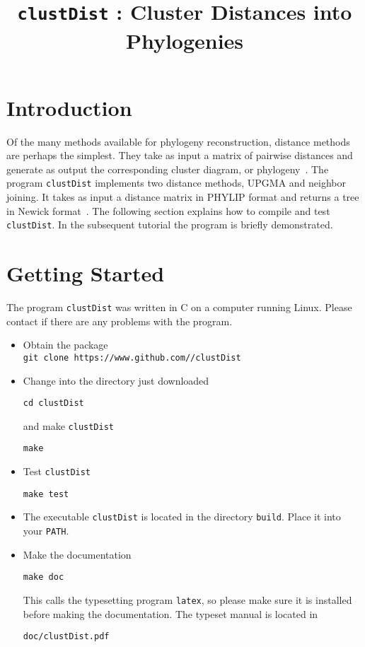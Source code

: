 \documentclass[a4paper, english]{article}
\begin{document}
\title{\texttt{clustDist} : Cluster Distances into Phylogenies}
\author{}

\date{}
\maketitle

\section{Introduction} 
Of the many methods available for phylogeny reconstruction, distance
methods are perhaps the simplest. They take as input a matrix of
pairwise distances and generate as output the corresponding cluster
diagram, or phylogeny~\citep{fel04:inf}. The program
\texttt{clustDist} implements two distance methods, UPGMA and neighbor
joining. It takes as input a distance matrix in PHYLIP format and
returns a tree in Newick format~\citep{fel05:phy}. The following
section explains how to compile and test \texttt{clustDist}. In the
subsequent tutorial the program is briefly demonstrated.


\section{Getting Started}
The program \texttt{clustDist} was written in C on a computer running Linux.
Please contact \texttt{} if there are any problems
with the program.
\begin{itemize}
\item Obtain the package\\
\texttt{git clone https://www.github.com//clustDist}
\item Change into the directory just downloaded
\begin{verbatim}
cd clustDist
\end{verbatim}
and make \texttt{clustDist}
\begin{verbatim}
make
\end{verbatim}
\item Test \texttt{clustDist}
\begin{verbatim}
make test
\end{verbatim}
\item The executable \texttt{clustDist} is located in the
  directory \texttt{build}. Place it into your \texttt{PATH}.
\item Make the documentation
\begin{verbatim}
make doc
\end{verbatim}
This calls the typesetting program \texttt{latex}, so please make sure
it is installed before making the documentation. The typeset manual is
located in
\begin{verbatim}
doc/clustDist.pdf
\end{verbatim}
\end{itemize}
\end{document}
